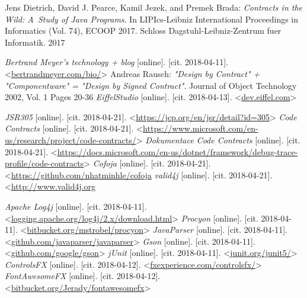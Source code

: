 \begin{thebibliography}{99}

 Jens Dietrich, David J. Pearce, Kamil Jezek, and Premek Brada:
\emph{Contracts in the Wild: A~Study of Java Programs}. In LIPIcs-Leibniz International Proceedings in Informatics (Vol. 74), ECOOP 2017. Schloss Dagstuhl-Leibniz-Zentrum fuer Informatik. 2017




 {\it Bertrand Meyer's technology + blog} [online]. [cit. 2018-04-11]. \textless\url{bertrandmeyer.com/bio/}\textgreater
{} Andreas Rausch:
\emph{"Design by Contract" + "Componentware" = "Design by Signed Contract"}. Journal of Object Technology 2002, Vol. 1 Pages 20-36 
 {\it EiffelStudio} [online]. [cit. 2018-04-13]. \textless\url{dev.eiffel.com}\textgreater


 {\it JSR305} [online]. [cit. 2018-04-21]. \textless\url{https://jcp.org/en/jsr/detail?id=305}\textgreater
{} {\it Code Contracts} [online]. [cit. 2018-04-21]. \textless\url{https://www.microsoft.com/en-us/research/project/code-contracts/}\textgreater
{} {\it Dokumentace Code Contracts} [online]. [cit. 2018-04-21]. \textless\url{https://docs.microsoft.com/en-us/dotnet/framework/debug-trace-profile/code-contracts}\textgreater
{} {\it Cofoja} [online]. [cit. 2018-04-21]. \textless\url{https://github.com/nhatminhle/cofoja}
 {\it valid4j} [online]. [cit. 2018-04-21]. \textless\url{http://www.valid4j.org}	

 {\it Apache Log4j} [online]. [cit. 2018-04-11]. \textless\url{logging.apache.org/log4j/2.x/download.html}\textgreater
{} {\it Procyon} [online]. [cit. 2018-04-11]. \textless\url{bitbucket.org/mstrobel/procyon}\textgreater
{} {\it JavaParser} [online]. [cit. 2018-04-11]. \textless\url{github.com/javaparser/javaparser}\textgreater
{} {\it Gson} [online]. [cit. 2018-04-11]. \textless\url{github.com/google/gson}\textgreater
{} {\it jUnit} [online]. [cit. 2018-04-11]. \textless\url{junit.org/junit5/}\textgreater
{} {\it ControlsFX} [online]. [cit. 2018-04-12]. \textless\url{fxexperience.com/controlsfx/}\textgreater
{} {\it FontAwesomeFX} [online]. [cit. 2018-04-12]. \textless\url{bitbucket.org/Jerady/fontawesomefx}\textgreater




\end{thebibliography}
